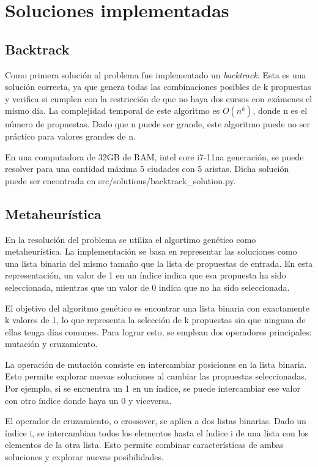 \documentclass[10pt]{article} %
\begin{document}
	
	\section{Soluciones implementadas}
	
	\subsection{Backtrack}
	
	Como primera solución al problema fue implementado un \textit{backtrack}. Esta es una solución correcta, ya que  genera todas las combinaciones posibles de k propuestas y verifica si cumplen con la restricción de que no haya dos cursos con exámenes el mismo día. La complejidad temporal de este algoritmo es $O(n^k)$, donde n es el número de propuestas. Dado que n puede ser grande, este algoritmo puede no ser práctico para valores grandes de n.
	
	
	En una computadora de 32GB de RAM, intel core i7-11na generación, se puede resolver para una cantidad máxima 5 ciudades con 5 aristas. Dicha solución puede ser encontrada en src/solutions/backtrack\_solution.py.
		
		 
	
	\subsection{Metaheur\'istica}
	
	En la resoluci\'on del problema se utiliza el algortimo gen\'etico como metaheur\'istica. La implementación se basa en representar las soluciones como una lista binaria del mismo tamaño que la lista de propuestas de entrada. En esta representación, un valor de 1 en un índice indica que esa propuesta ha sido seleccionada, mientras que un valor de 0 indica que no ha sido seleccionada.
	
	El objetivo del algoritmo genético es encontrar una lista binaria con exactamente k valores de 1, lo que representa la selección de k propuestas sin que ninguna de ellas tenga días comunes. Para lograr esto, se emplean dos operadores principales: mutación y cruzamiento.
	
	La operación de mutación consiste en intercambiar posiciones en la lista binaria. Esto permite explorar nuevas soluciones al cambiar las propuestas seleccionadas. Por ejemplo, si se encuentra un 1 en un índice, se puede intercambiar ese valor con otro índice donde haya un 0 y viceversa.
	
	El operador de cruzamiento, o crossover, se aplica a dos listas binarias. Dado un índice i, se intercambian todos los elementos hasta el índice i de una lista con los elementos de la otra lista. Esto permite combinar características de ambas soluciones y explorar nuevas posibilidades.
	
\end{document}
